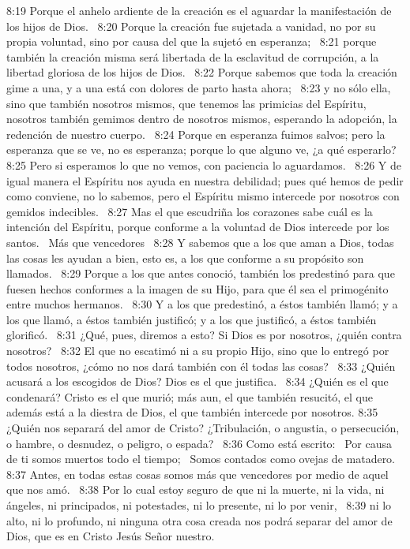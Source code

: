 8:19 Porque el anhelo ardiente de la creación es el aguardar la manifestación de los hijos de Dios.  
8:20 Porque la creación fue sujetada a vanidad, no por su propia voluntad, sino por causa del que la sujetó en esperanza;  
8:21 porque también la creación misma será libertada de la esclavitud de corrupción, a la libertad gloriosa de los hijos de Dios.  
8:22 Porque sabemos que toda la creación gime a una, y a una está con dolores de parto hasta ahora;  
8:23 y no sólo ella, sino que también nosotros mismos, que tenemos las primicias del Espíritu, nosotros también gemimos dentro de nosotros mismos, esperando la adopción, la redención de nuestro cuerpo.  
8:24 Porque en esperanza fuimos salvos; pero la esperanza que se ve, no es esperanza; porque lo que alguno ve, ¿a qué esperarlo?  
8:25 Pero si esperamos lo que no vemos, con paciencia lo aguardamos.  
8:26 Y de igual manera el Espíritu nos ayuda en nuestra debilidad; pues qué hemos de pedir como conviene, no lo sabemos, pero el Espíritu mismo intercede por nosotros con gemidos indecibles.  
8:27 Mas el que escudriña los corazones sabe cuál es la intención del Espíritu, porque conforme a la voluntad de Dios intercede por los santos.  
Más que vencedores  
8:28 Y sabemos que a los que aman a Dios, todas las cosas les ayudan a bien, esto es, a los que conforme a su propósito son llamados.  
8:29 Porque a los que antes conoció, también los predestinó para que fuesen hechos conformes a la imagen de su Hijo, para que él sea el primogénito entre muchos hermanos.  
8:30 Y a los que predestinó, a éstos también llamó; y a los que llamó, a éstos también justificó; y a los que justificó, a éstos también glorificó.  
8:31 ¿Qué, pues, diremos a esto? Si Dios es por nosotros, ¿quién contra nosotros?  
8:32 El que no escatimó ni a su propio Hijo, sino que lo entregó por todos nosotros, ¿cómo no nos dará también con él todas las cosas?  
8:33 ¿Quién acusará a los escogidos de Dios? Dios es el que justifica.  
8:34 ¿Quién es el que condenará? Cristo es el que murió; más aun, el que también resucitó, el que además está a la diestra de Dios, el que también intercede por nosotros. 
8:35 ¿Quién nos separará del amor de Cristo? ¿Tribulación, o angustia, o persecución, o hambre, o desnudez, o peligro, o espada?  
8:36 Como está escrito:  
Por causa de ti somos muertos todo el tiempo;  
Somos contados como ovejas de matadero. 
8:37 Antes, en todas estas cosas somos más que vencedores por medio de aquel que nos amó.  
8:38 Por lo cual estoy seguro de que ni la muerte, ni la vida, ni ángeles, ni principados, ni potestades, ni lo presente, ni lo por venir,  
8:39 ni lo alto, ni lo profundo, ni ninguna otra cosa creada nos podrá separar del amor de Dios, que es en Cristo Jesús Señor nuestro.  

